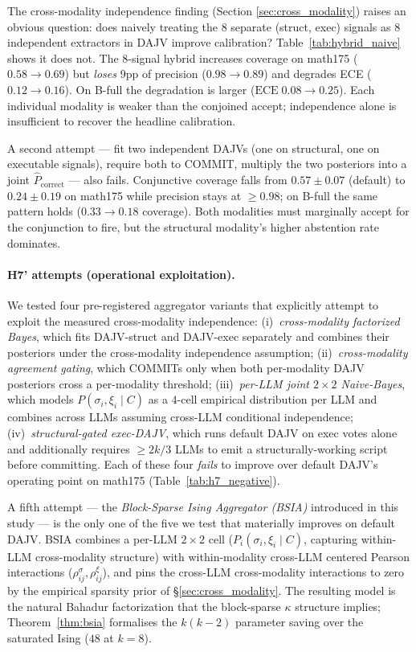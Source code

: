 The cross-modality independence finding (Section
\ref{sec:cross_modality}) raises an obvious question: does naively
treating the 8 separate (struct, exec) signals as 8 independent
extractors in DAJV improve calibration? Table~\ref{tab:hybrid_naive}
shows it does not. The 8-signal hybrid increases coverage on math175
($0.58 \to 0.69$) but \emph{loses} 9pp of precision ($0.98 \to 0.89$)
and degrades ECE ($0.12 \to 0.16$). On B-full the degradation is
larger ($\text{ECE}\;0.08 \to 0.25$). Each individual modality is
weaker than the conjoined accept; independence alone is insufficient
to recover the headline calibration.

A second attempt --- fit two independent DAJVs (one on structural,
one on executable signals), require both to COMMIT, multiply the two
posteriors into a joint $\hat P_{\text{correct}}$ --- also fails.
Conjunctive coverage falls from $0.57 \pm 0.07$ (default) to
$0.24 \pm 0.19$ on math175 while precision stays at $\geq 0.98$; on
B-full the same pattern holds ($0.33 \to 0.18$ coverage). Both
modalities must marginally accept for the conjunction to fire, but
the structural modality's higher abstention rate dominates.

\paragraph{H7' attempts (operational exploitation).}
We tested four pre-registered aggregator variants that explicitly
attempt to exploit the measured cross-modality independence:
(i)~\emph{cross-modality factorized Bayes}, which fits DAJV-struct
and DAJV-exec separately and combines their posteriors under the
cross-modality independence assumption; (ii)~\emph{cross-modality
agreement gating}, which COMMITs only when both per-modality DAJV
posteriors cross a per-modality threshold;
(iii)~\emph{per-LLM joint $2 \!\times\! 2$ Naive-Bayes}, which models
$P(\sigma_i, \xi_i \mid C)$ as a $4$-cell empirical distribution per
LLM and combines across LLMs assuming cross-LLM conditional
independence;
(iv)~\emph{structural-gated exec-DAJV}, which runs default DAJV on
exec votes alone and additionally requires $\geq 2k/3$ LLMs to emit
a structurally-working script before committing.
Each of these four \emph{fails} to improve over default DAJV's
operating point on math175 (Table~\ref{tab:h7_negative}).

A fifth attempt --- the \emph{Block-Sparse Ising Aggregator (BSIA)}
introduced in this study --- is the only one of the five we test
that materially improves on default DAJV.  BSIA combines a per-LLM
$2 \!\times\! 2$ cell ($P_i(\sigma_i, \xi_i \mid C)$, capturing
within-LLM cross-modality structure) with within-modality cross-LLM
centered Pearson interactions ($\rho_{ij}^\sigma, \rho_{ij}^\xi$),
and pins the cross-LLM cross-modality interactions to zero by the
empirical sparsity prior of \S\ref{sec:cross_modality}.  The
resulting model is the natural Bahadur factorization that the
block-sparse $\kappa$ structure implies; Theorem~\ref{thm:bsia}
formalises the $k(k-2)$ parameter saving over the saturated Ising
($48$ at $k=8$).

